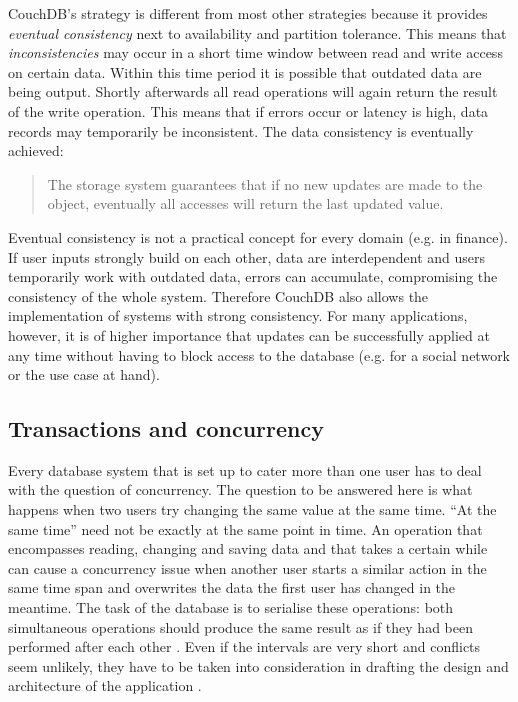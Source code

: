 CouchDB's strategy is different from most other strategies because it provides \textit{eventual consistency} next to availability and partition tolerance. This means that \textit{inconsistencies} may occur in a short time window between read and write access on certain data. Within this time period it is possible that outdated data are being output. Shortly afterwards all read operations will again return the result of the write operation. This means that if errors occur or latency is high, data records may temporarily be inconsistent. The data consistency is eventually achieved:

\begin{quote}
The storage system guarantees that if no new updates are made to the object, eventually all accesses will return the last updated value. 
\end{quote}

Eventual consistency is not a practical concept for every domain (e.g. in finance). If user inputs strongly build on each other, data are interdependent and users temporarily work with outdated data, errors can accumulate, compromising the consistency of the whole system. Therefore CouchDB also allows the implementation of systems with strong consistency. For many applications, however, it is of higher importance that updates can be successfully applied at any time without having to block access to the database (e.g. for a social network or the use case at hand).

\subsection{Transactions and concurrency}
\label{subsec:concurrency}

Every database system that is set up to cater more than one user has to deal with the question of concurrency. The question to be answered here is what happens when two users try changing the same value at the same time. \enquote{At the same time} need not be exactly at the same point in time. An operation that encompasses reading, changing and saving data and that takes a certain while can cause a concurrency issue when another user starts a similar action in the same time span and overwrites the data the first user has changed in the meantime. The task of the database is to serialise these operations: both simultaneous operations should produce the same result as if they had been performed after each other . Even if the intervals are very short and conflicts seem unlikely, they have to be taken into consideration in drafting the design and architecture of the application .

